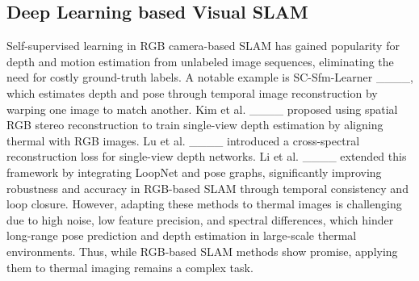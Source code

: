 \subsection{Deep Learning based Visual SLAM}
Self-supervised learning in RGB camera-based SLAM has gained popularity for depth and motion estimation from unlabeled image sequences, eliminating the need for costly ground-truth labels. A notable example is SC-Sfm-Learner ____, which estimates depth and pose through temporal image reconstruction by warping one image to match another. Kim et al. ____ proposed using spatial RGB stereo reconstruction to train single-view depth estimation by aligning thermal with RGB images. Lu et al. ____ introduced a cross-spectral reconstruction loss for single-view depth networks. Li et al. ____ extended this framework by integrating LoopNet and pose graphs, significantly improving robustness and accuracy in RGB-based SLAM through temporal consistency and loop closure. However, adapting these methods to thermal images is challenging due to high noise, low feature precision, and spectral differences, which hinder long-range pose prediction and depth estimation in large-scale thermal environments. Thus, while RGB-based SLAM methods show promise, applying them to thermal imaging remains a complex task.